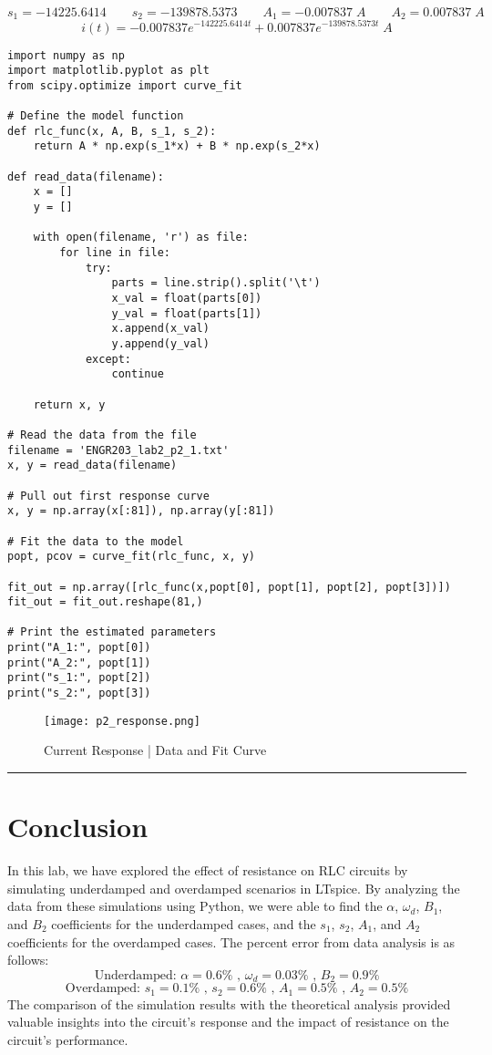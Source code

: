 \documentclass[11pt]{article}
\begin{document}
$$s_1 = -14225.6414 \qquad s_2 = -139878.5373 \qquad A_1 = -0.007837 \;A \qquad A_2 = 0.007837 \;A$$
$$i(t) = -0.007837e^{-142225.6414t}+0.007837e^{-139878.5373t} \;A$$
\begin{lstlisting}
import numpy as np
import matplotlib.pyplot as plt
from scipy.optimize import curve_fit

# Define the model function
def rlc_func(x, A, B, s_1, s_2):
    return A * np.exp(s_1*x) + B * np.exp(s_2*x)

def read_data(filename):
    x = []
    y = []

    with open(filename, 'r') as file:
        for line in file:
            try:
                parts = line.strip().split('\t')
                x_val = float(parts[0])
                y_val = float(parts[1])
                x.append(x_val)
                y.append(y_val)
            except:
                continue

    return x, y

# Read the data from the file
filename = 'ENGR203_lab2_p2_1.txt'
x, y = read_data(filename)

# Pull out first response curve
x, y = np.array(x[:81]), np.array(y[:81])

# Fit the data to the model
popt, pcov = curve_fit(rlc_func, x, y)

fit_out = np.array([rlc_func(x,popt[0], popt[1], popt[2], popt[3])])
fit_out = fit_out.reshape(81,)

# Print the estimated parameters
print("A_1:", popt[0])
print("A_2:", popt[1])
print("s_1:", popt[2])
print("s_2:", popt[3])
\end{lstlisting}
\begin{figure}[H]
    \centering
    \texttt{[image: p2\_response.png]}
    \caption{Current Response | Data and Fit Curve}
    \label{fig:my_label}
\end{figure}
\vspace{5mm}
\hrule

\section*{\textcolor{mycolor}{Conclusion}}

In this lab, we have explored the effect of resistance on RLC circuits by simulating underdamped and overdamped scenarios in LTspice. By analyzing the data from these simulations using Python, we were able to find the $\alpha$, $\omega_d$, $B_1$, and $B_2$ coefficients for the underdamped cases, and the $s_1$, $s_2$, $A_1$, and $A_2$ coefficients for the overdamped cases. The percent error from data analysis is as follows:
$$\text{Underdamped: }\alpha = 0.6\% \text{ , }\omega_d = 0.03\%\text{ , }B_2=0.9\%$$
$$\text{Overdamped: }s_1 = 0.1\% \text{ , }s_2 = 0.6\%\text{ , }A_1=0.5\%\text{ , }A_2=0.5\%$$
The comparison of the simulation results with the theoretical analysis provided valuable insights into the circuit's response and the impact of resistance on the circuit's performance.
\end{document}

